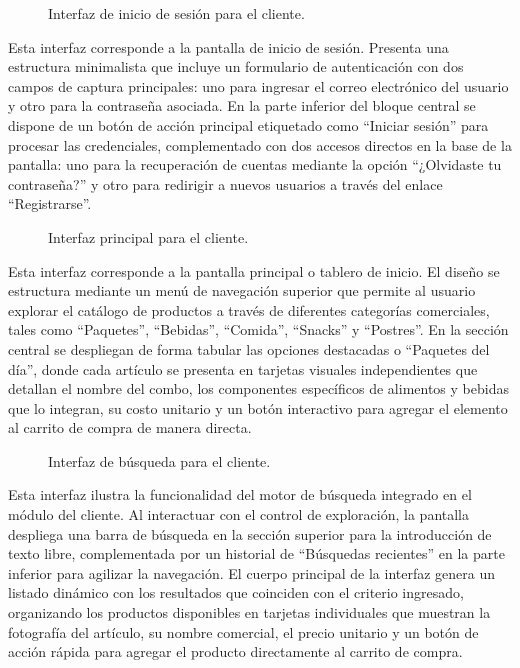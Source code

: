 \begin{figure}[H]
    \centering
    
    \caption{Interfaz de inicio de sesión para el cliente.}
    \label{fig:ui-cli-01}
\end{figure}

Esta interfaz corresponde a la pantalla de inicio de sesión. Presenta una estructura minimalista que incluye un formulario de autenticación con dos campos de captura principales: uno para ingresar el correo electrónico del usuario y otro para la contraseña asociada. En la parte inferior del bloque central se dispone de un botón de acción principal etiquetado como ``Iniciar sesión'' para procesar las credenciales, complementado con dos accesos directos en la base de la pantalla: uno para la recuperación de cuentas mediante la opción ``¿Olvidaste tu contraseña?'' y otro para redirigir a nuevos usuarios a través del enlace ``Registrarse''.

\begin{figure}[H]
    \centering
    
    \caption{Interfaz principal para el cliente.}
    \label{fig:ui-cli-02}
\end{figure}

Esta interfaz corresponde a la pantalla principal o tablero de inicio. El diseño se estructura mediante un menú de navegación superior que permite al usuario explorar el catálogo de productos a través de diferentes categorías comerciales, tales como ``Paquetes'', ``Bebidas'', ``Comida'', ``Snacks'' y ``Postres''. En la sección central se despliegan de forma tabular las opciones destacadas o ``Paquetes del día'', donde cada artículo se presenta en tarjetas visuales independientes que detallan el nombre del combo, los componentes específicos de alimentos y bebidas que lo integran, su costo unitario y un botón interactivo para agregar el elemento al carrito de compra de manera directa.

\begin{figure}[H]
    \centering
    
    \caption{Interfaz de búsqueda para el cliente.}
    \label{fig:ui-cli-03}
\end{figure}

Esta interfaz ilustra la funcionalidad del motor de búsqueda integrado en el módulo del cliente. Al interactuar con el control de exploración, la pantalla despliega una barra de búsqueda en la sección superior para la introducción de texto libre, complementada por un historial de ``Búsquedas recientes'' en la parte inferior para agilizar la navegación. El cuerpo principal de la interfaz genera un listado dinámico con los resultados que coinciden con el criterio ingresado, organizando los productos disponibles en tarjetas individuales que muestran la fotografía del artículo, su nombre comercial, el precio unitario y un botón de acción rápida para agregar el producto directamente al carrito de compra.

